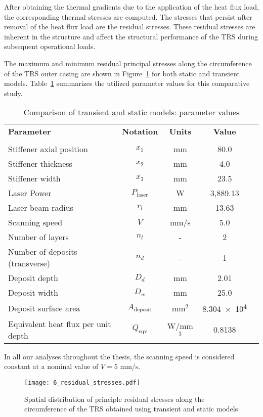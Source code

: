 After obtaining the thermal gradients due to the application of the heat flux load, the corresponding thermal stresses are computed. The stresses that persist after removal of the heat flux load are the residual stresses. These residual stresses are inherent in the structure and affect the structural performance of the \ac{TRS} during subsequent operational loads. 

The maximum and minimum residual principal stresses along the circumference of the \ac{TRS} outer casing are shown in Figure~\ref{fig:Sprinciple} for both static and transient models. Table~\ref{table:validation} summarizes the utilized parameter values for this comparative study.

\begin{table}[h!]
\centering
\renewcommand{\arraystretch}{1.0}%
\small\addtolength{\tabcolsep}{-5pt}
\caption{Comparison of transient and static models: parameter values}
\label{table:validation}
\begin{tabular}{lcccc}
\hline\hline
\bf Parameter & \bf Notation & \bf Units & \bf Value \\\\ \hline
Stiffener axial position & $x_1$ & mm & 80.0  \\
Stiffener thickness  & $x_2$ & mm & 4.0  \\
Stiffener width & $x_3$ & mm & 23.5  \\
Laser Power & $P_{\textrm{laser}}$ & W & 3,889.13 \\ 
Laser beam radius & ${r_l}$ & mm & 13.63 \\ 
Scanning speed& ${V}$ & mm/s & 5.0 \\ 
Number of layers & $n_l$ & - & 2\\
Number of deposits (transverse) & $n_d$ & - & 1\\
Deposit depth  & $D_d$ & mm & 2.01\\
Deposit width  & $D_w$ & mm & 25.0 \\
Deposit surface area  & $A_\textrm{deposit}$ & mm$^2$ & \num{8.304e4} \\
Equivalent heat flux per unit depth & $Q_\textrm{eqv}$ & W/mm$^3$ & 0.8138 \\
\hline\hline
\end{tabular}
\end{table}

In all our analyses throughout the thesis, the scanning speed is considered constant at a nominal value of $V = 5$ mm/s.

\begin{figure}[h!]
	\centering
	\texttt{[image: 6\_residual\_stresses.pdf]}
	\caption{ \label{fig:Sprinciple} Spatial distribution of principle residual stresses along the circumference of the \ac{TRS} obtained using transient and static models}
\end{figure}

